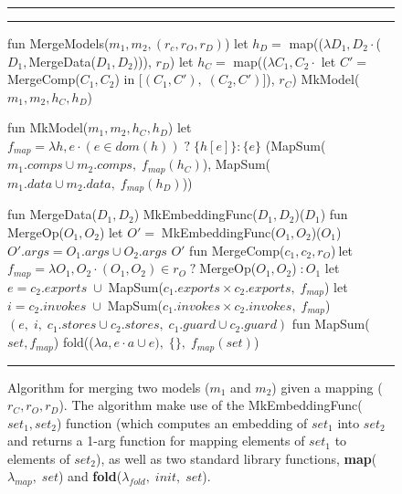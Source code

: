 
\begin{figure}[ht]
\hrule\hrule
\centering
  \begin{slangmath}[numbers=left,emph={MergeModels, MkMap, MkModel,%
                    MergeData, MergeComp, MergeOp, MapSum}]
fun MergeModels($m_1, m_2, (r_c,r_O,r_D)$)
  let $h_D=$ map(($\lambda D_1,D_2 \cdot$($D_1,$MergeData($D_1, D_2$))), $r_D$)
  let $h_C=$ map(($\lambda C_1,C_2 \cdot$ let $C'=\; $MergeComp($C_1, C_2$) in [$(C_1, C'),\; (C_2, C')$]), $r_C$)
  MkModel($m_1, m_2, h_C, h_D$)

fun MkModel($m_1, m_2, h_C, h_D$)
  let $f_{map} = \lambda h,e \cdot (e \in dom(h)) \;?\; \{h[e]\} : \{e\}$
  (MapSum($m_1.comps \cup m_2.comps,\; f_{map}(h_C)$), MapSum($m_1.data \cup m_2.data,\; f_{map}(h_D)$))

fun MergeData($D_1, D_2$)       \eqv MkEmbeddingFunc($D_1, D_2$)($D_1$)
fun MergeOp($O_1, O_2$)         \eqv let $O'=\; $MkEmbeddingFunc($O_1, O_2$)($O_1$)
                        $O'.args= O_1.args \cup O_2.args$ 
                        $O'$
fun MergeComp($c_1, c_2, r_O$)$\:$\eqv let $f_{map} = \lambda O_1,O_2 \cdot (O_1,O_2)\in r_O\;?\;$MergeOp($O_1,O_2$)$\;: O_1$
                        let $e = c_2.exports\;\cup\;$MapSum($c_1.exports \times c_2.exports,\; f_{map}$)
                        let $i = c_2.invokes\;\cup\;$MapSum($c_1.invokes \times c_2.invokes,\; f_{map}$)
                        $(e,\; i,\; c_1.stores \cup c_2.stores,\; c_1.guard \cup c_2.guard)$
fun MapSum($set, f_{map}$)          \eqv fold(($\lambda a, e \cdot a \cup e),\; \{\},\; f_{map}(set)$)
  \end{slangmath}
\hrule\vskip7pt
\caption{Algorithm for merging two models ($m_1$ and $m_2$) given a
  mapping ($r_C, r_O, r_D$).  The algorithm make use of the {\rmfamily
    MkEmbeddingFunc($set_1, set_2$)} function (which computes an
  embedding of $set_1$ into $set_2$ and returns a 1-arg function for
  mapping elements of $set_1$ to elements of $set_2$), as well as two
  standard library functions, \textbf{map}($\lambda_{map},\; set$) and
  \textbf{fold}($\lambda_{fold},\; init,\; set$).}
\label{fig-mergingin-alg-func}
\end{figure}
